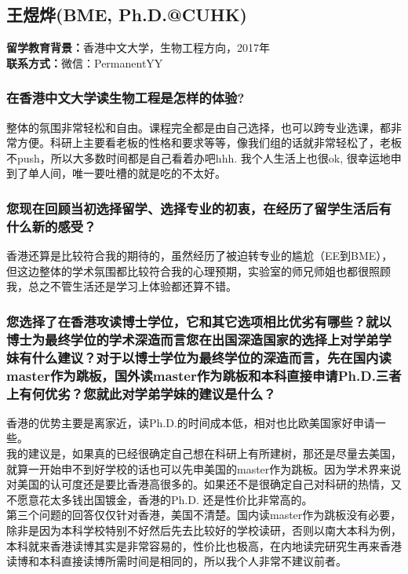 \documentclass[a4paper,UTF8]{book}
\begin{document}
    
\clearpage
\subsection{王煜烨(BME, Ph.D.@CUHK)}
    \textbf{留学教育背景：}香港中文大学，生物工程方向，2017年\\
    \textbf{联系方式：}微信：PermanentYY

    \subsubsection*{在香港中文大学读生物工程是怎样的体验?}
    整体的氛围非常轻松和自由。课程完全都是由自己选择，也可以跨专业选课，都非常方便。科研上主要看老板的性格和要求等等，像我们组的话就非常轻松了，老板不push，所以大多数时间都是自己看着办吧hhh. 我个人生活上也很ok, 很幸运地申到了单人间，唯一要吐槽的就是吃的不太好。

    \subsubsection*{您现在回顾当初选择留学、选择专业的初衷，在经历了留学生活后有什么新的感受？}
    香港还算是比较符合我的期待的，虽然经历了被迫转专业的尴尬（EE到BME），但这边整体的学术氛围都比较符合我的心理预期，实验室的师兄师姐也都很照顾我，总之不管生活还是学习上体验都还算不错。

    \subsubsection*{您选择了在香港攻读博士学位，它和其它选项相比优劣有哪些？就以博士为最终学位的学术深造而言您在出国深造国家的选择上对学弟学妹有什么建议？对于以博士学位为最终学位的深造而言，先在国内读master作为跳板，国外读master作为跳板和本科直接申请Ph.D.三者上有何优劣？您就此对学弟学妹的建议是什么？}
    香港的优势主要是离家近，读Ph.D.的时间成本低，相对也比欧美国家好申请一些。\\
    我的建议是，如果真的已经很确定自己想在科研上有所建树，那还是尽量去美国，就算一开始申不到好学校的话也可以先申美国的master作为跳板。因为学术界来说对美国的认可度还是要比香港高很多的。如果还不是很确定自己对科研的热情，又不愿意花太多钱出国镀金，香港的Ph.D. 还是性价比非常高的。\\
    第三个问题的回答仅仅针对香港，美国不清楚。国内读master作为跳板没有必要，除非是因为本科学校特别不好然后先去比较好的学校读研，否则以南大本科为例，本科就来香港读博其实是非常容易的，性价比也极高，在内地读完研究生再来香港读博和本科直接读博所需时间是相同的，所以我个人非常不建议前者。
\end{document}
